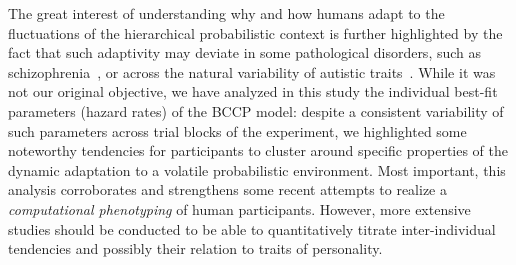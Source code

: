 \documentclass[10pt,letterpaper]{article}
\newcommand{\citep}[1]{\cite{#1}}
\newcommand{\AM}[1]{\textbf{\textcolor{blue}{[AM: #1]}}}
\begin{document}
The great interest of understanding why and how humans adapt to the fluctuations of the hierarchical probabilistic context is further highlighted by the fact that such adaptivity may deviate in some pathological disorders, such as schizophrenia~\citep{Adams12, Jardri2017}, or across the natural variability of autistic traits~\citep{Karvelis2018}. %
While it was not our original objective, we have analyzed in this study the individual best-fit parameters (hazard rates) of the BCCP model: despite a consistent variability of such parameters across trial blocks of the experiment, we highlighted some noteworthy tendencies for participants to cluster around specific properties of the dynamic adaptation to a volatile probabilistic environment. Most important, this analysis corroborates and strengthens some recent attempts to realize a \textit{computational phenotyping} of human participants. However, more extensive studies should be conducted to be able to quantitatively titrate inter-individual tendencies and possibly their relation to traits of personality.
\end{document}
